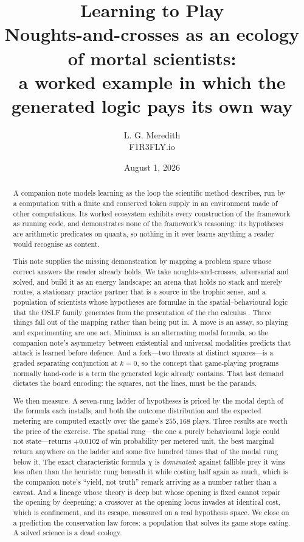 \documentclass[11pt]{article}
\title{\textbf{Learning to Play}\\[2mm]
\large Noughts-and-crosses as an ecology of mortal scientists:\\
a worked example in which the generated logic pays its own way}
\author{L. G. Meredith\\ F1R3FLY.io}
\date{August 1, 2026}
\theoremstyle{definition}
\theoremstyle{plain}
\theoremstyle{remark}
\newcommand{\rh}{\textsf{rho}}
\begin{document}
\maketitle

\begin{abstract}
A companion note \cite{scientist} models learning as the loop the scientific method
describes, run by a computation with a finite and conserved token supply in an
environment made of other computations. Its worked ecosystem exhibits every
construction of the framework as running code, and demonstrates none of the
framework's reasoning: its hypotheses are arithmetic predicates on quanta, so
nothing in it ever learns anything a reader would recognise as content.

This note supplies the missing demonstration by mapping a problem space whose
correct answers the reader already holds. We take noughts-and-crosses,
adversarial and solved, and build it as an energy landscape: an arena that
holds no stack and merely routes, a stationary practice partner that is a
source in the trophic sense, and a population of scientists whose hypotheses
are formulae in the spatial--behavioural logic that the OSLF family generates
from the presentation of the \rh{} calculus \cite{classifier}. Three things fall
out of the mapping rather than being put in. A move is an assay, so playing and
experimenting are one act. Minimax is an alternating modal formula, so the
companion note's asymmetry between existential and universal modalities predicts
that attack is learned before defence. And a fork---two threats at distinct
squares---is a graded separating conjunction at $k=0$, so the concept that
game-playing programs normally hand-code is a term the generated logic already
contains. That last demand dictates the board encoding: the squares, not the
lines, must be the parands.

We then measure. A seven-rung ladder of hypotheses is priced by the modal depth
of the formula each installs, and both the outcome distribution and the expected
metering are computed exactly over the game's $255{,}168$ plays. Three results
are worth the price of the exercise. The spatial rung---the one a purely
behavioural logic could not state---returns $+0.0102$ of win probability per
metered unit, the best marginal return anywhere on the ladder and some five
hundred times that of the modal rung below it. The exact characteristic formula
$\chi$ is \emph{dominated}: against fallible prey it wins less often than the
heuristic rung beneath it while costing half again as much, which is the
companion note's ``yield, not truth'' remark arriving as a number rather than a
caveat. And a lineage whose theory is deep but whose opening is fixed cannot
repair the opening by deepening; a crossover at the opening locus invades at
identical cost, which is confinement, and its escape, measured on a real
hypothesis space. We close on a prediction the conservation law forces: a
population that solves its game stops eating. A solved science is a dead
ecology.
\end{abstract}
\end{document}
